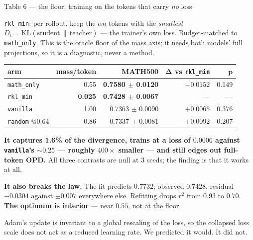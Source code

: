 \documentclass[aspectratio=169,11pt]{beamer}
\newcommand{\up}[1]{\textcolor{good}{\textbf{#1}}}
\newcommand{\dn}[1]{\textcolor{bad}{\textbf{#1}}}
\newcommand{\aside}[1]{{\footnotesize\textcolor{mut}{#1}}}
\begin{document}
\begin{frame}{Table 6 --- the floor: training on the tokens that carry \emph{no} loss}

\aside{\texttt{rkl\_min}: per rollout, keep the $\alpha n$ tokens with the \emph{smallest}
$D_t=\mathrm{KL}(\text{student}\,\|\,\text{teacher})$ --- the trainer's own loss. Budget-matched
to \texttt{math\_only}. This is the oracle floor of the mass axis; it needs both models' full
projections, so it is a diagnostic, never a method.}

\vspace{0.7em}
\centering
{\small
\begin{tabular}{@{}lrrrr@{}}
\toprule
\textbf{arm} & \textbf{mass/token} & \textbf{MATH500} & $\boldsymbol{\Delta}$ \textbf{vs} \texttt{rkl\_min} & $\boldsymbol{p}$ \\
\midrule
\texttt{math\_only}   & 0.55  & \up{0.7580 $\pm$ 0.0120} & $-0.0152$ & 0.149 \\
\texttt{rkl\_min}     & \dn{0.025} & \textbf{0.7428 $\pm$ 0.0067} & --- & --- \\
\texttt{vanilla}      & 1.00  & 0.7363 $\pm$ 0.0090 & $+0.0065$ & 0.376 \\
\texttt{random} @0.64 & 0.86  & 0.7337 $\pm$ 0.0081 & $+0.0092$ & 0.207 \\
\bottomrule
\end{tabular}}

\flushleft
\vspace{0.8em}
\textbf{It captures 1.6\% of the divergence, trains at a loss of $0.0006$ against
\texttt{vanilla}'s ${\sim}0.25$ --- roughly $400\times$ smaller --- and still edges out
full-token OPD.} All three contrasts are null at 3 seeds; the finding is that it works at all.

\medskip
\textbf{It also breaks the law.} The fit predicts $0.7732$; observed $0.7428$, residual
\dn{$-0.0304$} against $\pm0.007$ everywhere else. Refitting drops $r^2$ from $0.93$ to
$\mathbf{0.70}$. \textbf{The optimum is interior} --- near $0.55$, not at the floor.

\medskip
\aside{Adam's update is invariant to a global rescaling of the loss, so the collapsed loss scale
does not act as a reduced learning rate. We predicted it would. It did not.}

\end{frame}
\end{document}
